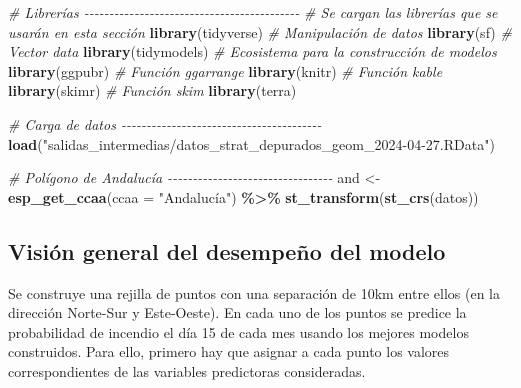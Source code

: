 \documentclass[12pt,a4paper,]{book}
\newenvironment{Shaded}{\begin{snugshade}}{\end{snugshade}}
\newcommand{\AttributeTok}[1]{\textcolor[rgb]{0.13,0.29,0.53}{#1}}
\newcommand{\CommentTok}[1]{\textcolor[rgb]{0.56,0.35,0.01}{\textit{#1}}}
\newcommand{\FunctionTok}[1]{\textcolor[rgb]{0.13,0.29,0.53}{\textbf{#1}}}
\newcommand{\NormalTok}[1]{#1}
\newcommand{\OtherTok}[1]{\textcolor[rgb]{0.56,0.35,0.01}{#1}}
\newcommand{\SpecialCharTok}[1]{\textcolor[rgb]{0.81,0.36,0.00}{\textbf{#1}}}
\newcommand{\StringTok}[1]{\textcolor[rgb]{0.31,0.60,0.02}{#1}}
\numberwithin{dummy}{section}
\theoremstyle{ocrenumbox}
\theoremstyle{blacknumex}
\theoremstyle{blacknumbox}
\theoremstyle{ocrenum}
\theoremstyle{ocrenum}
\begin{document}
\begin{Shaded}
\begin{Highlighting}[]
\CommentTok{\# Librerías {-}{-}{-}{-}{-}{-}{-}{-}{-}{-}{-}{-}{-}{-}{-}{-}{-}{-}{-}{-}{-}{-}{-}{-}{-}{-}{-}{-}{-}{-}{-}{-}{-}{-}{-}{-}{-}{-}{-}{-}{-}{-}{-}}
\CommentTok{\# Se cargan las librerías que se usarán en esta sección}
\FunctionTok{library}\NormalTok{(tidyverse) }\CommentTok{\# Manipulación de datos }
\FunctionTok{library}\NormalTok{(sf) }\CommentTok{\# Vector data}
\FunctionTok{library}\NormalTok{(tidymodels) }\CommentTok{\# Ecosistema para la construcción de modelos}
\FunctionTok{library}\NormalTok{(ggpubr) }\CommentTok{\# Función ggarrange}
\FunctionTok{library}\NormalTok{(knitr) }\CommentTok{\# Función kable}
\FunctionTok{library}\NormalTok{(skimr) }\CommentTok{\# Función skim}
\FunctionTok{library}\NormalTok{(terra)}

\CommentTok{\# Carga de datos {-}{-}{-}{-}{-}{-}{-}{-}{-}{-}{-}{-}{-}{-}{-}{-}{-}{-}{-}{-}{-}{-}{-}{-}{-}{-}{-}{-}{-}{-}{-}{-}{-}{-}{-}{-}{-}{-}{-}{-}}
\FunctionTok{load}\NormalTok{(}\StringTok{"salidas\_intermedias/datos\_strat\_depurados\_geom\_2024{-}04{-}27.RData"}\NormalTok{) }

\CommentTok{\# Polígono de Andalucía {-}{-}{-}{-}{-}{-}{-}{-}{-}{-}{-}{-}{-}{-}{-}{-}{-}{-}{-}{-}{-}{-}{-}{-}{-}{-}{-}{-}{-}{-}{-}{-}{-}}
\NormalTok{and }\OtherTok{\textless{}{-}} \FunctionTok{esp\_get\_ccaa}\NormalTok{(}\AttributeTok{ccaa =} \StringTok{"Andalucía"}\NormalTok{) }\SpecialCharTok{\%\textgreater{}\%} 
  \FunctionTok{st\_transform}\NormalTok{(}\FunctionTok{st\_crs}\NormalTok{(datos))}
\end{Highlighting}
\end{Shaded}

\hypertarget{visiuxf3n-general-del-desempeuxf1o-del-modelo-1}{%
\subsection{Visión general del desempeño del
modelo}\label{visiuxf3n-general-del-desempeuxf1o-del-modelo-1}}

Se construye una rejilla de puntos con una separación de 10km entre
ellos (en la dirección Norte-Sur y Este-Oeste). En cada uno de los
puntos se predice la probabilidad de incendio el día 15 de cada mes
usando los mejores modelos construidos. Para ello, primero hay que
asignar a cada punto los valores correspondientes de las variables
predictoras consideradas.
\end{document}
